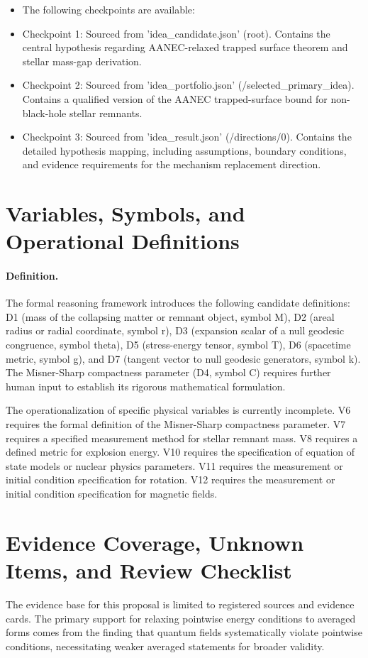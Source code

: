 \documentclass[conference]{IEEEtran}
\begin{document}
\begin{itemize}
\item The following checkpoints are available:
\item Checkpoint 1: Sourced from 'idea\_candidate.json' (root). Contains the central hypothesis regarding AANEC-relaxed trapped surface theorem and stellar mass-gap derivation.
\item Checkpoint 2: Sourced from 'idea\_portfolio.json' (/selected\_primary\_idea). Contains a qualified version of the AANEC trapped-surface bound for non-black-hole stellar remnants.
\item Checkpoint 3: Sourced from 'idea\_result.json' (/directions/0). Contains the detailed hypothesis mapping, including assumptions, boundary conditions, and evidence requirements for the mechanism replacement direction.
\end{itemize}

\section{Variables, Symbols, and Operational Definitions}
\paragraph{Definition.} The formal reasoning framework introduces the following candidate definitions: D1 (mass of the collapsing matter or remnant object, symbol M), D2 (areal radius or radial coordinate, symbol r), D3 (expansion scalar of a null geodesic congruence, symbol theta), D5 (stress-energy tensor, symbol T), D6 (spacetime metric, symbol g), and D7 (tangent vector to null geodesic generators, symbol k). The Misner-Sharp compactness parameter (D4, symbol C) requires further human input to establish its rigorous mathematical formulation.

The operationalization of specific physical variables is currently incomplete. V6 requires the formal definition of the Misner-Sharp compactness parameter. V7 requires a specified measurement method for stellar remnant mass. V8 requires a defined metric for explosion energy. V10 requires the specification of equation of state models or nuclear physics parameters. V11 requires the measurement or initial condition specification for rotation. V12 requires the measurement or initial condition specification for magnetic fields.

\section{Evidence Coverage, Unknown Items, and Review Checklist}
The evidence base for this proposal is limited to registered sources and evidence cards. The primary support for relaxing pointwise energy conditions to averaged forms comes from the finding that quantum fields systematically violate pointwise conditions, necessitating weaker averaged statements for broader validity.~\cite{cite_0ed84243cf171bc4}
\end{document}
